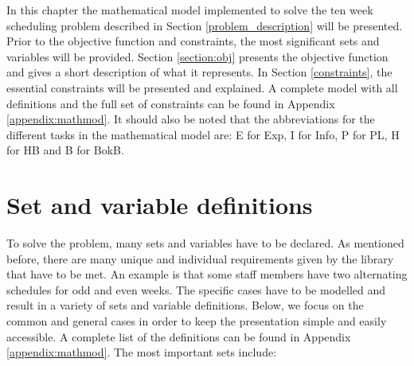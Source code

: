 In this chapter the mathematical model implemented to solve the ten week scheduling problem described in Section \ref{problem_description} will be presented. Prior to the objective function and constraints, the most significant sets and variables will be provided. Section \ref{section:obj} presents the objective function and gives a short description of what it represents. In Section \ref{constraints}, the essential constraints will be presented and explained. A complete model with all definitions and the full set of constraints can be found in Appendix \ref{appendix:mathmod}. It should also be noted that the abbreviations for the different tasks in the mathematical model are: E for Exp, I for Info, P for PL, H for HB and B for BokB.%
\section{Set and variable definitions} \label{variables}
To solve the problem, many sets and variables have to be declared. As mentioned before, there are many unique and individual requirements given by the library that have to be met. An example is that some staff members have two alternating schedules for odd and even weeks. The specific cases have to be modelled and result in a variety of sets and variable definitions. Below, we focus on the common and general cases in order to keep the presentation simple and easily accessible. A complete list of the definitions can be found in Appendix \ref{appendix:mathmod}. The most important sets include: \\
 \\
  \\
	 	\\
	 	\\
                  \\
	 \\
                            \\
	 \\
                    \\
                \\
               \\
	 	\\
	 	\\

